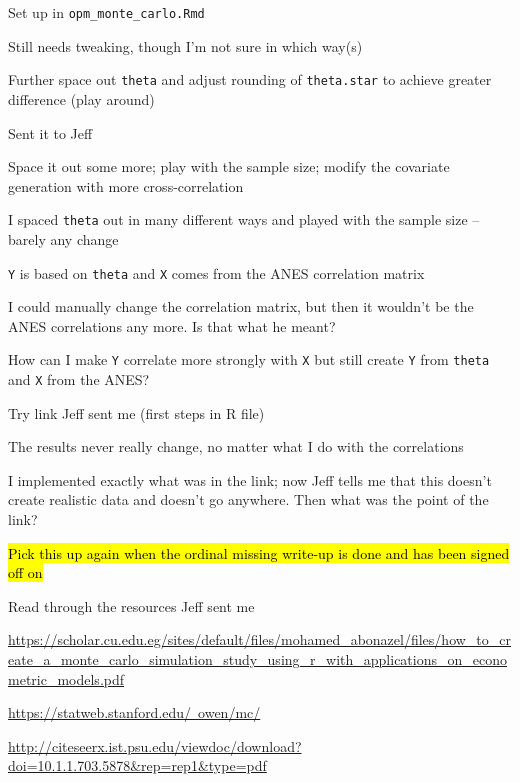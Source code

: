 \begin{coi}
\begin{coi}
				\item Set up in \texttt{opm\_monte\_carlo.Rmd}
				\item Still needs tweaking, though I'm not sure in which way(s)
				\item Further space out \texttt{theta} and adjust rounding of \texttt{theta.star} to achieve greater difference (play around)
				\item Sent it to Jeff
				\item Space it out some more; play with the sample size; modify the covariate generation with more cross-correlation
					\begin{coi}
						\item I spaced \texttt{theta} out in many different ways and played with the sample size -- barely any change
						\item \texttt{Y} is based on \texttt{theta} and \texttt{X} comes from the ANES correlation matrix
						\item I could manually change the correlation matrix, but then it wouldn't be the ANES correlations any more. Is that what he meant?
						\item How can I make \texttt{Y} correlate more strongly with \texttt{X} but still create \texttt{Y} from \texttt{theta} and \texttt{X} from the ANES?
						\item Try link Jeff sent me (first steps in R file)
						\item The results never really change, no matter what I do with the correlations
						\item I implemented exactly what was in the link; now Jeff tells me that this doesn't create realistic data and doesn't go anywhere. Then what was the point of the link?
					\end{coi}
				\item \hl{Pick this up again when the ordinal missing write-up is done and has been signed off on}
				\item Read through the resources Jeff sent me
					\begin{coi}
						\item \href{https://scholar.cu.edu.eg/sites/default/files/mohamed_abonazel/files/how_to_create_a_monte_carlo_simulation_study_using_r_with_applications_on_econometric_models.pdf}{https://scholar.cu.edu.eg/sites/default/files/mohamed\_abonazel/files/how\_to\_create\_a\_monte\_carlo\_simulation\_study\_using\_r\_with\_applications\_on\_econometric\_models.pdf}
						\item \href{https://statweb.stanford.edu/~owen/mc/}{https://statweb.stanford.edu/~owen/mc/}
						\item \href{http://citeseerx.ist.psu.edu/viewdoc/download?doi=10.1.1.703.5878&rep=rep1&type=pdf}{http://citeseerx.ist.psu.edu/viewdoc/download?doi=10.1.1.703.5878\&rep=rep1\&type=pdf}
					\end{coi}
			\end{coi}
	\end{coi}
	
